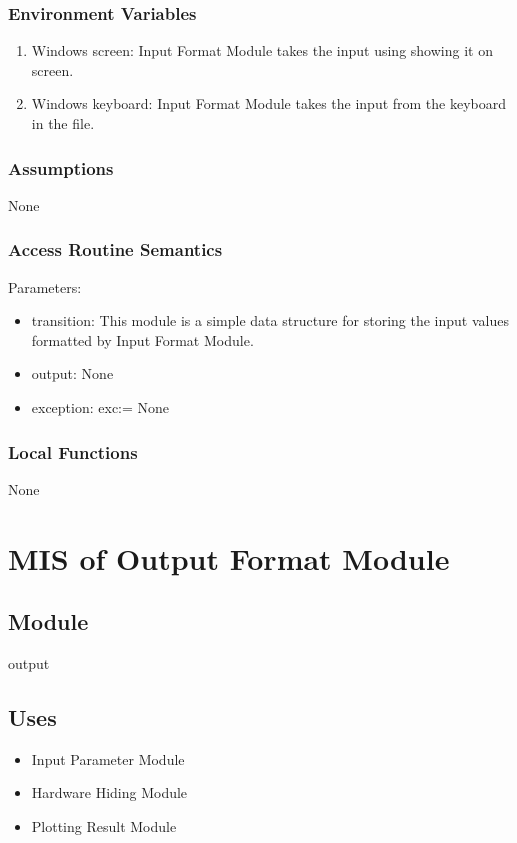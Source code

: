 \documentclass[12pt, titlepage]{article}
\begin{document}
\subsubsection{Environment Variables}

\begin{enumerate}
    \item Windows screen: Input Format Module takes the input using showing it on screen.
    \item Windows keyboard: Input Format Module takes the input from the keyboard in the file. 
\end{enumerate}

\subsubsection{Assumptions}

None

\subsubsection{Access Routine Semantics}

\noindent Parameters:
\begin{itemize}
\item transition: This module is a simple data structure for storing the input values formatted by Input Format Module. 
\item output: None
\item exception: exc:= None
\end{itemize}


\subsubsection{Local Functions}

None

\newpage
\section{MIS of Output Format Module} \label{Output_Format_Module}

\subsection{Module}
output

\subsection{Uses}
\begin{itemize}
    \item Input Parameter Module 
    \item Hardware Hiding Module    
    \item Plotting Result Module
\end{itemize}
\end{document}
